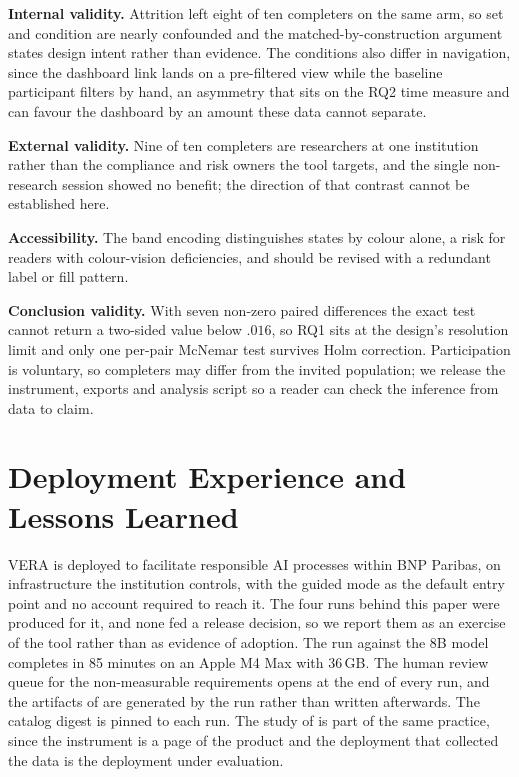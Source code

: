 \documentclass[10pt,conference]{IEEEtran}
\begin{document}
\textbf{Internal validity.}
Attrition left eight of ten completers on the same arm, so set and condition are nearly confounded and the matched-by-construction argument states design intent rather than evidence. The conditions also differ in navigation, since the dashboard link lands on a pre-filtered view while the baseline participant filters by hand, an asymmetry that sits on the RQ2 time measure and can favour the dashboard by an amount these data cannot separate.

\textbf{External validity.}
Nine of ten completers are researchers at one institution rather than the compliance and risk owners the tool targets, and the single non-research session showed no benefit; the direction of that contrast cannot be established here.

\textbf{Accessibility.}
The band encoding distinguishes states by colour alone, a risk for readers with colour-vision deficiencies, and should be revised with a redundant label or fill pattern.

\textbf{Conclusion validity.}
With seven non-zero paired differences the exact test cannot return a two-sided value below $.016$, so RQ1 sits at the design's resolution limit and only one per-pair McNemar test survives Holm correction. Participation is voluntary, so completers may differ from the invited population; we release the instrument, exports and analysis script so a reader can check the inference from data to claim.

\section{Deployment Experience and Lessons Learned}
\label{sec:lessons}

VERA is deployed to facilitate responsible AI processes within BNP Paribas, on infrastructure the institution controls, with the guided mode as the default entry point and no account required to reach it.
The four runs behind this paper were produced for it, and none fed a release decision, so we report them as an exercise of the tool rather than as evidence of adoption.
The run against the 8B model completes in 85 minutes on an Apple M4 Max with 36\,GB.
The human review queue for the non-measurable requirements opens at the end of every run, and the artifacts of  are generated by the run rather than written afterwards.
The catalog digest is pinned to each run.
The study of  is part of the same practice, since the instrument is a page of the product and the deployment that collected the data is the deployment under evaluation.
\end{document}
